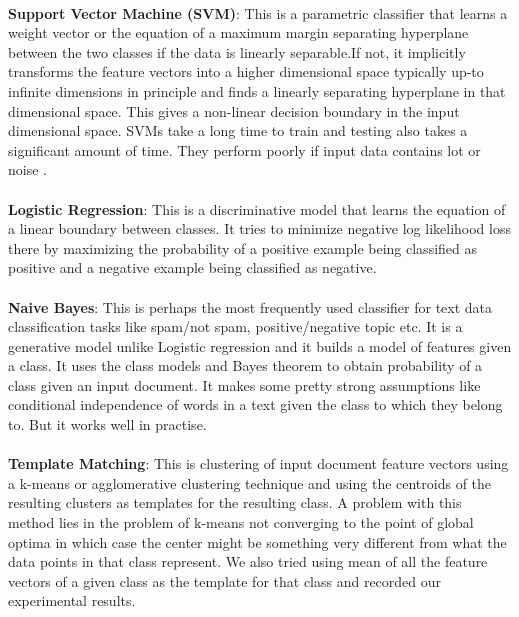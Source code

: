 \documentclass[a4paper,26pt]{article}
\begin{document}
\paragraph{}
\textbf{Support Vector Machine (SVM)}: This is a parametric classifier that learns a weight vector or the equation of a maximum margin separating hyperplane between the two classes if the data is linearly separable.If not, it implicitly transforms the feature vectors into a higher dimensional space typically up-to infinite dimensions in principle and finds a linearly separating hyperplane in that dimensional space. This gives a non-linear decision boundary in the input dimensional space. SVMs take a long time to train and testing also takes a significant amount of time. They perform poorly if input data contains lot or noise . 
\paragraph{}
\textbf{Logistic Regression}: This is a discriminative model that learns the equation of a linear boundary between classes. It tries to minimize negative log likelihood loss there by maximizing the probability of a positive example being classified as positive and a negative example being classified as negative.   

\paragraph{}
\textbf{Naive Bayes}: This is perhaps the most frequently used classifier for text data classification tasks like spam/not spam, positive/negative topic etc. It is a generative model unlike Logistic regression and it builds a model of features given a class. It uses the class models and Bayes theorem to obtain probability of a class given an input document. It makes some pretty strong assumptions like conditional independence of words in a text given the class to which they belong to. But it works well in practise.  

\paragraph{}
\textbf{Template Matching}: This is clustering of input document feature vectors using a k-means or agglomerative clustering technique and using the centroids of the resulting clusters as templates for the resulting class. A problem with this method lies in the problem of k-means not converging to the point of global optima in which case the center might be something very different from what the data points in that class represent. We also tried using mean of all the feature vectors of a given class as the template for that class and recorded our experimental results.   
\end{document}
